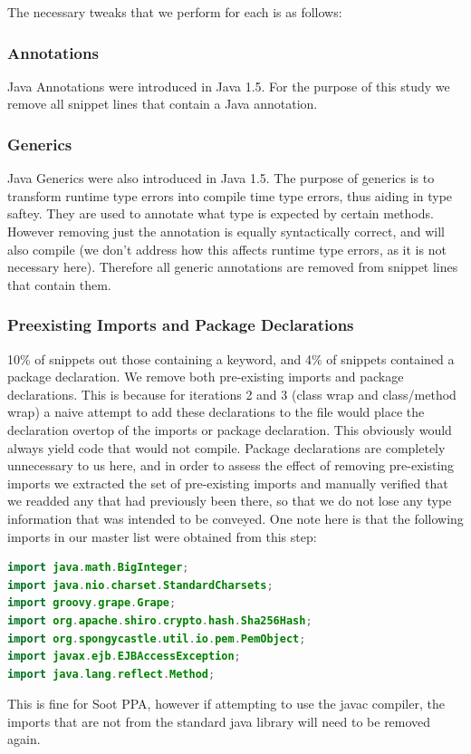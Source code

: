 \documentclass[10pt, conference]{IEEEtran}
\begin{document}
The necessary tweaks that we perform for each is as follows:
\subsubsection{Annotations}
Java Annotations were introduced in Java 1.5. For the purpose of this study we remove all snippet lines that contain a Java annotation. 

\subsubsection{Generics}
Java Generics were also introduced in Java 1.5. The purpose of generics is to transform runtime type errors into compile time type errors, thus aiding in type saftey. They are used to annotate what type is expected by certain methods. However removing just the annotation is equally syntactically correct, and will also compile (we don't address how this affects runtime type errors, as it is not necessary here). Therefore all generic annotations are removed from snippet lines that contain them.

\subsubsection{Preexisting Imports and Package Declarations}
10\% of snippets out those containing a keyword, and  4\% of snippets contained a package declaration. We remove both pre-existing imports and package declarations. This is because for iterations 2 and 3 (class wrap and class/method wrap) a naive attempt to add these declarations to the file would place the declaration overtop of the imports or package declaration. This obviously would always yield code that would not compile. Package declarations are completely unnecessary to us here, and in order to assess the effect of removing pre-existing imports we extracted the set of pre-existing imports and manually verified that we readded any that had previously been there, so that we do not lose any type information that was intended to be conveyed. 
One note here is that the following imports in our master list were obtained from this step:
\begin{lstlisting}[language=java]
import java.math.BigInteger;                                                                            
import java.nio.charset.StandardCharsets;                                                               
import groovy.grape.Grape;                                                                              
import org.apache.shiro.crypto.hash.Sha256Hash;                                                         
import org.spongycastle.util.io.pem.PemObject;                                                          
import javax.ejb.EJBAccessException;                                                                    
import java.lang.reflect.Method;
\end{lstlisting}
This is fine for Soot PPA, however if attempting to use the javac compiler, the imports that are not from the standard java library will need to be removed again.
\end{document}
